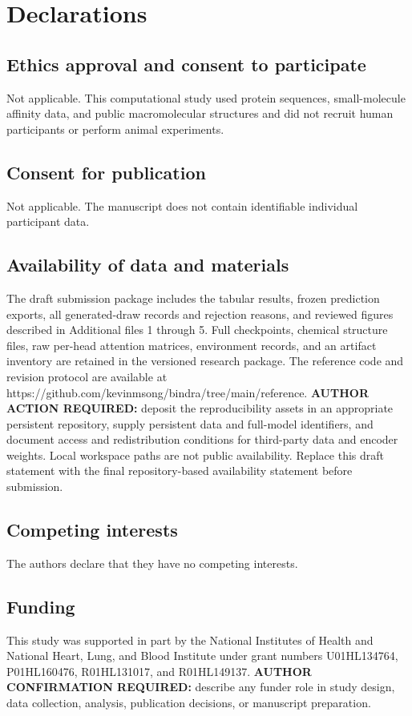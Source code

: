 \documentclass[12pt,a4paper]{article}
\begin{document}
\section*{Declarations}
\subsection*{Ethics approval and consent to participate}
Not applicable. This computational study used protein sequences, small-molecule affinity data, and public macromolecular structures and did not recruit human participants or perform animal experiments.

\subsection*{Consent for publication}
Not applicable. The manuscript does not contain identifiable individual participant data.

\subsection*{Availability of data and materials}
The draft submission package includes the tabular results, frozen prediction exports, all generated-draw records and rejection reasons, and reviewed figures described in Additional files 1 through 5. Full checkpoints, chemical structure files, raw per-head attention matrices, environment records, and an artifact inventory are retained in the versioned research package. The reference code and revision protocol are available at https://github.com/kevinmsong/bindra/tree/main/reference. \textbf{AUTHOR ACTION REQUIRED:} deposit the reproducibility assets in an appropriate persistent repository, supply persistent data and full-model identifiers, and document access and redistribution conditions for third-party data and encoder weights. Local workspace paths are not public availability. Replace this draft statement with the final repository-based availability statement before submission.

\subsection*{Competing interests}
The authors declare that they have no competing interests.

\subsection*{Funding}
This study was supported in part by the National Institutes of Health and National Heart, Lung, and Blood Institute under grant numbers U01HL134764, P01HL160476, R01HL131017, and R01HL149137. \textbf{AUTHOR CONFIRMATION REQUIRED:} describe any funder role in study design, data collection, analysis, publication decisions, or manuscript preparation.
\end{document}
